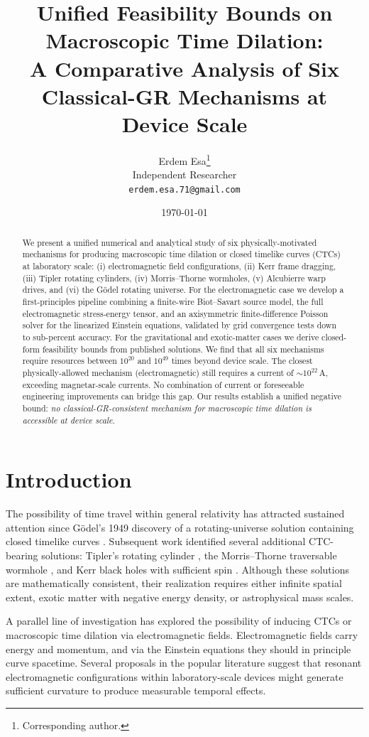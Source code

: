 \documentclass[11pt,a4paper,twocolumn]{article}
\title{Unified Feasibility Bounds on Macroscopic Time Dilation:\\A Comparative Analysis of Six Classical-GR Mechanisms at Device Scale}
\author{Erdem Esa\thanks{Corresponding author.}\\ \small Independent Researcher\\ \small \texttt{erdem.esa.71@gmail.com}}
\date{\today}
\begin{document}
\maketitle
\begin{abstract}
We present a unified numerical and analytical study of six physically-motivated mechanisms for producing macroscopic time dilation or closed timelike curves (CTCs) at laboratory scale: (i) electromagnetic field configurations, (ii) Kerr frame dragging, (iii) Tipler rotating cylinders, (iv) Morris--Thorne wormholes, (v) Alcubierre warp drives, and (vi) the G\"odel rotating universe. For the electromagnetic case we develop a first-principles pipeline combining a finite-wire Biot--Savart source model, the full electromagnetic stress-energy tensor, and an axisymmetric finite-difference Poisson solver for the linearized Einstein equations, validated by grid convergence tests down to sub-percent accuracy. For the gravitational and exotic-matter cases we derive closed-form feasibility bounds from published solutions. We find that all six mechanisms require resources between $10^{20}$ and $10^{49}$ times beyond device scale. The closest physically-allowed mechanism (electromagnetic) still requires a current of $\sim 10^{22}\,\si{\ampere}$, exceeding magnetar-scale currents. No combination of current or foreseeable engineering improvements can bridge this gap. Our results establish a unified negative bound: \emph{no classical-GR-consistent mechanism for macroscopic time dilation is accessible at device scale}.
\end{abstract}

\section{Introduction}
\label{sec:intro}

The possibility of time travel within general relativity has attracted sustained attention since G\"odel's 1949 discovery of a rotating-universe solution containing closed timelike curves \citep{Godel1949}. Subsequent work identified several additional CTC-bearing solutions: Tipler's rotating cylinder \citep{Tipler1974}, the Morris--Thorne traversable wormhole \citep{MorrisThorne1988}, and Kerr black holes with sufficient spin \citep{Kerr1963}. Although these solutions are mathematically consistent, their realization requires either infinite spatial extent, exotic matter with negative energy density, or astrophysical mass scales.

A parallel line of investigation has explored the possibility of inducing CTCs or macroscopic time dilation via electromagnetic fields. Electromagnetic fields carry energy and momentum, and via the Einstein equations they should in principle curve spacetime. Several proposals in the popular literature suggest that resonant electromagnetic configurations within laboratory-scale devices might generate sufficient curvature to produce measurable temporal effects.
\end{document}
